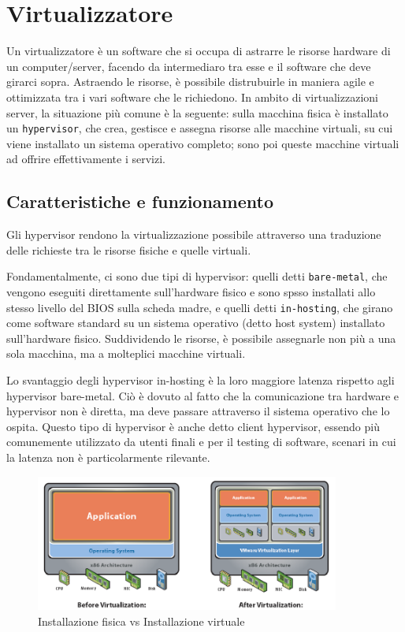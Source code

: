 \section{Virtualizzatore}
Un virtualizzatore è un software che si occupa di astrarre le risorse hardware di un computer/server, facendo da intermediaro tra esse e il software che deve girarci sopra. Astraendo le risorse, è possibile distrubuirle in maniera agile e ottimizzata tra i vari software che le richiedono.
In ambito di virtualizzazioni server, la situazione più comune è la seguente: sulla macchina fisica è installato un \texttt{hypervisor}, che crea, gestisce e assegna risorse alle macchine virtuali, su cui viene installato un sistema operativo completo; sono poi queste macchine virtuali ad offrire effettivamente i servizi.

\subsection{Caratteristiche e funzionamento}
Gli hypervisor rendono la virtualizzazione possibile attraverso una traduzione delle richieste tra le risorse fisiche e quelle virtuali.

Fondamentalmente, ci sono due tipi di hypervisor: quelli detti \texttt{bare-metal}, che vengono eseguiti direttamente sull'hardware fisico e sono spsso installati allo stesso livello del BIOS sulla scheda madre, e quelli detti \texttt{in-hosting}, che girano come software standard su un sistema operativo (detto host system) installato sull'hardware fisico. Suddividendo le risorse, è possibile assegnarle non più a una sola macchina, ma a molteplici macchine virtuali.

Lo svantaggio degli hypervisor in-hosting è la loro maggiore latenza rispetto agli hypervisor bare-metal. Ciò è dovuto al fatto che la comunicazione tra hardware e hypervisor non è diretta, ma deve passare attraverso il sistema operativo che lo ospita. Questo tipo di hypervisor è anche detto client hypervisor, essendo più comunemente utilizzato da utenti finali e per il testing di software, scenari in cui la latenza non è particolarmente rilevante.

\begin{figure}[ht]
    \centering
    \includegraphics[width=10cm]{figure/virtualization.png}
    \caption{Installazione fisica vs Installazione virtuale}
\end{figure}

